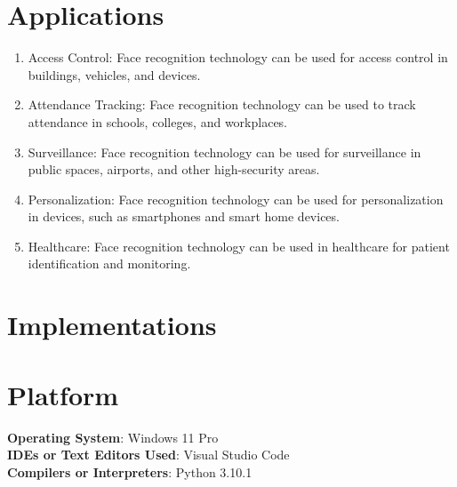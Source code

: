 \documentclass[openany]{report}
\begin{document}
\section{Applications}

\begin{enumerate}
    \item Access Control: Face recognition technology can be used for access control in buildings, vehicles, and devices.
    \item Attendance Tracking: Face recognition technology can be used to track attendance in schools, colleges, and workplaces.
    \item Surveillance: Face recognition technology can be used for surveillance in public spaces, airports, and other high-security areas.
    \item Personalization: Face recognition technology can be used for personalization in devices, such as smartphones and smart home devices.
    \item Healthcare: Face recognition technology can be used in healthcare for patient identification and monitoring.
\end{enumerate}
\section{Implementations}

\section{Platform}
\textbf{Operating System}: Windows 11 Pro\\
\textbf{IDEs or Text Editors Used}: Visual Studio Code\\
\textbf{Compilers or Interpreters}: Python 3.10.1\\
\end{document}
